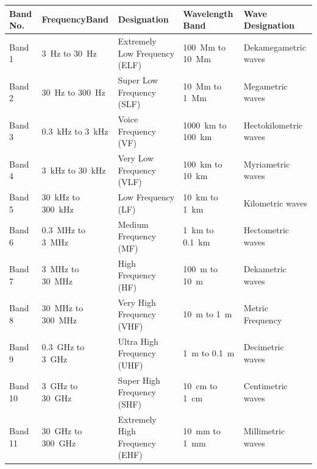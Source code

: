 \begin{table}%
\centering
{\small
\begin{tabular}{@{}p{1.25cm}p{2.25cm}p{2.75cm}p{2.25cm}p{2.75cm}@{}}
\toprule
\textbf{Band No.} & \textbf{Frequency\newline Band} & \textbf{Designation} & \textbf{Wavelength \newline Band} & \textbf{Wave \newline Designation} \\
\midrule
Band 1 & \SI{3}{\hertz} to \SI{30}{\hertz} & Extremely Low Frequency (ELF) & \SI{100}{\mega\meter} to \SI{10}{\mega\meter} & Dekamegametric waves\\
Band 2 & \SI{30}{\hertz} to \SI{300}{\hertz} & Super Low Frequency (SLF) & \SI{10}{\mega\meter} to \SI{1}{\mega\meter} & Megametric waves\\
Band 3 & \SI{0.3}{\kilo\hertz} to \SI{3}{\kilo\hertz} & Voice Frequency (VF) & \SI{1000}{\kilo\meter} to \SI{100}{\kilo\meter} & Hectokilometric waves\\
Band 4 & \SI{3}{\kilo\hertz} to \SI{30}{\kilo\hertz} & Very Low Frequency (VLF) & \SI{100}{\kilo\meter} to \SI{10}{\kilo\meter} & Myriametric waves\\
Band 5 & \SI{30}{\kilo\hertz} to \SI{300}{\kilo\hertz} & Low Frequency (LF) & \SI{10}{\kilo\meter} to \SI{1}{\kilo\meter} & Kilometric waves\\
Band 6 & \SI{0.3}{\mega\hertz} to \SI{3}{\mega\hertz} & Medium Frequency (MF) & \SI{1}{\kilo\meter} to \SI{0.1}{\kilo\meter} & Hectometric waves\\
Band 7 & \SI{3}{\mega\hertz} to \SI{30}{\mega\hertz} & High Frequency (HF) & \SI{100}{\meter} to \SI{10}{\meter} & Dekametric waves\\
Band 8 & \SI{30}{\mega\hertz} to \SI{300}{\mega\hertz} & Very High Frequency (VHF) & \SI{10}{\meter} to \SI{1}{\meter} & Metric Frequency \\
Band 9 & \SI{0.3}{\giga\hertz} to \SI{3}{\giga\hertz} & Ultra High Frequency (UHF) & \SI{1}{\meter} to \SI{0.1}{\meter} & Decimetric waves\\
Band 10 & \SI{3}{\giga\hertz} to \SI{30}{\giga\hertz} & Super High Frequency (SHF) & \SI{10}{\centi\meter} to \SI{1}{\centi\meter} & Centimetric waves\\
Band 11 & \SI{30}{\giga\hertz} to \SI{300}{\giga\hertz} & Extremely High Frequency (EHF) & \SI{10}{\milli\meter} to \SI{1}{\milli\meter} & Millimetric waves\\

\end{tabular}}
\end{table}
